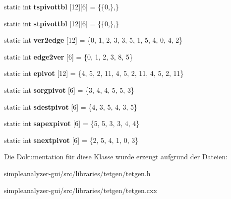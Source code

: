\begin{DoxyCompactItemize}
\item 
\hypertarget{classtetgenmesh_a9b4b95dfdce4c8c1ae1b4e683bfeca5e}{static int {\bfseries tspivottbl} \mbox{[}12\mbox{]}\mbox{[}6\mbox{]} = \{\{0,\},\}}\label{classtetgenmesh_a9b4b95dfdce4c8c1ae1b4e683bfeca5e}

\item 
\hypertarget{classtetgenmesh_ab90b809e43493efe2b4132ef5b056dba}{static int {\bfseries stpivottbl} \mbox{[}12\mbox{]}\mbox{[}6\mbox{]} = \{\{0,\},\}}\label{classtetgenmesh_ab90b809e43493efe2b4132ef5b056dba}

\item 
\hypertarget{classtetgenmesh_ad70ef1b418a713939d2c2470de436afb}{static int {\bfseries ver2edge} \mbox{[}12\mbox{]} = \{0, 1, 2, 3, 3, 5, 1, 5, 4, 0, 4, 2\}}\label{classtetgenmesh_ad70ef1b418a713939d2c2470de436afb}

\item 
\hypertarget{classtetgenmesh_a5c068f480e2912a38c19bbbd492e2aae}{static int {\bfseries edge2ver} \mbox{[}6\mbox{]} = \{0, 1, 2, 3, 8, 5\}}\label{classtetgenmesh_a5c068f480e2912a38c19bbbd492e2aae}

\item 
\hypertarget{classtetgenmesh_ab15ad8f91a8c322861e8a399b4199a08}{static int {\bfseries epivot} \mbox{[}12\mbox{]} = \{4, 5, 2, 11, 4, 5, 2, 11, 4, 5, 2, 11\}}\label{classtetgenmesh_ab15ad8f91a8c322861e8a399b4199a08}

\item 
\hypertarget{classtetgenmesh_a36e2c583a5a4148c7ca53888b7bd928d}{static int {\bfseries sorgpivot} \mbox{[}6\mbox{]} = \{3, 4, 4, 5, 5, 3\}}\label{classtetgenmesh_a36e2c583a5a4148c7ca53888b7bd928d}

\item 
\hypertarget{classtetgenmesh_a1d8ce836af65d2a6c2c008b43112ca5b}{static int {\bfseries sdestpivot} \mbox{[}6\mbox{]} = \{4, 3, 5, 4, 3, 5\}}\label{classtetgenmesh_a1d8ce836af65d2a6c2c008b43112ca5b}

\item 
\hypertarget{classtetgenmesh_a25610aea34045250cbd88b54d4734383}{static int {\bfseries sapexpivot} \mbox{[}6\mbox{]} = \{5, 5, 3, 3, 4, 4\}}\label{classtetgenmesh_a25610aea34045250cbd88b54d4734383}

\item 
\hypertarget{classtetgenmesh_a0d47762d99e1d47863062c532fe61122}{static int {\bfseries snextpivot} \mbox{[}6\mbox{]} = \{2, 5, 4, 1, 0, 3\}}\label{classtetgenmesh_a0d47762d99e1d47863062c532fe61122}

\end{DoxyCompactItemize}


Die Dokumentation für diese Klasse wurde erzeugt aufgrund der Dateien\-:\begin{DoxyCompactItemize}
\item 
simpleanalyzer-\/gui/src/libraries/tetgen/tetgen.\-h\item 
simpleanalyzer-\/gui/src/libraries/tetgen/tetgen.\-cxx\end{DoxyCompactItemize}
